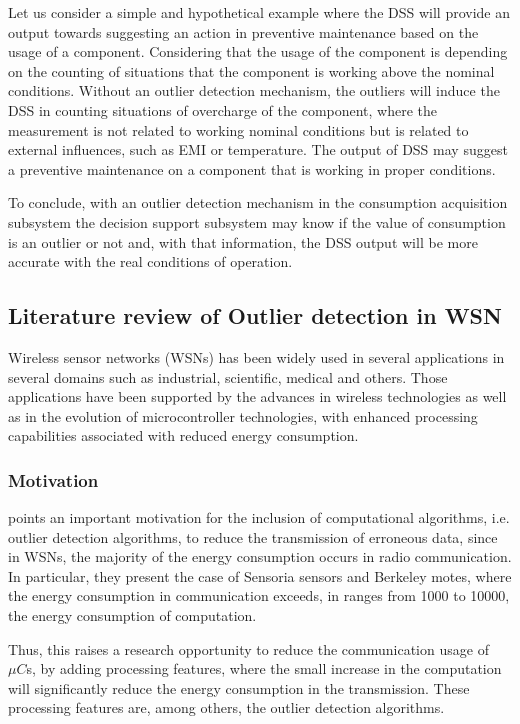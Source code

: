 Let us consider a simple and hypothetical example where the DSS will provide an output towards suggesting an action in preventive maintenance based on the usage of a component. Considering that the usage of the component is depending on the counting of situations that the component is working above the nominal conditions. Without an outlier detection mechanism, the outliers will induce the DSS in counting situations of overcharge of the component, where the measurement is not related to working nominal conditions but is related to external influences, such as EMI or temperature. The output of DSS may suggest a preventive maintenance on a component that is working in proper conditions.

To conclude, with an outlier detection mechanism in the consumption acquisition subsystem the decision support subsystem may know if the value of consumption is an outlier or not and, with that information, the DSS output will be more accurate with the real conditions of operation.


\subsection{Literature review of Outlier detection in WSN}
\label{sec:od_wsn}
Wireless sensor networks (WSNs) has been widely used in several applications in several domains such as industrial, scientific, medical and others. Those applications have been supported by the advances in wireless technologies as well as in the evolution of microcontroller technologies, with enhanced processing capabilities associated with reduced energy consumption.

\subsubsection{Motivation}

\cite{class:rajasegarar:2007} points an important motivation for the inclusion of computational algorithms, i.e. outlier detection algorithms, to reduce the transmission of erroneous data, since in WSNs, the majority of the energy consumption occurs in radio communication. In particular, they present the case of Sensoria sensors and Berkeley motes, where the energy consumption in communication exceeds, in ranges from 1000 to 10000, the energy consumption of computation.

Thus, this raises a research opportunity to reduce the communication usage of $\mu C$s, by adding processing features, where the small increase in the computation will significantly reduce the energy consumption in the transmission. These processing features are, among others, the outlier detection algorithms.


